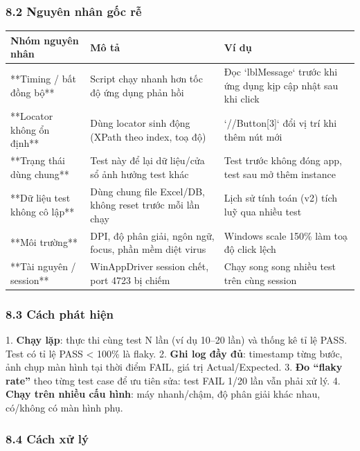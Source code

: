 \subsubsection{8.2 Nguyên nhân gốc rễ}

\begin{table}[H]
\centering
\begin{tabular}{|l|l|l|}
\hline
\textbf{Nhóm nguyên nhân} & \textbf{Mô tả} & \textbf{Ví dụ} \\ \hline
**Timing / bất đồng bộ** & Script chạy nhanh hơn tốc độ ứng dụng phản hồi & Đọc `lblMessage` trước khi ứng dụng kịp cập nhật sau khi click \\ \hline
**Locator không ổn định** & Dùng locator sinh động (XPath theo index, toạ độ) & `//Button[3]` đổi vị trí khi thêm nút mới \\ \hline
**Trạng thái dùng chung** & Test này để lại dữ liệu/cửa sổ ảnh hưởng test khác & Test trước không đóng app, test sau mở thêm instance \\ \hline
**Dữ liệu test không cô lập** & Dùng chung file Excel/DB, không reset trước mỗi lần chạy & Lịch sử tính toán (v2) tích luỹ qua nhiều test \\ \hline
**Môi trường** & DPI, độ phân giải, ngôn ngữ, focus, phần mềm diệt virus & Windows scale 150\% làm toạ độ click lệch \\ \hline
**Tài nguyên / session** & WinAppDriver session chết, port 4723 bị chiếm & Chạy song song nhiều test trên cùng session \\ \hline
\end{tabular}
\end{table}




\subsubsection{8.3 Cách phát hiện}

1. \textbf{Chạy lặp}: thực thi cùng test N lần (ví dụ 10–20 lần) và thống kê tỉ lệ PASS. Test có tỉ lệ PASS < 100\% là flaky.
2. \textbf{Ghi log đầy đủ}: timestamp từng bước, ảnh chụp màn hình tại thời điểm FAIL, giá trị Actual/Expected.
3. \textbf{Đo “flaky rate”} theo từng test case để ưu tiên sửa: test FAIL 1/20 lần vẫn phải xử lý.
4. \textbf{Chạy trên nhiều cấu hình}: máy nhanh/chậm, độ phân giải khác nhau, có/không có màn hình phụ.

\subsubsection{8.4 Cách xử lý}

